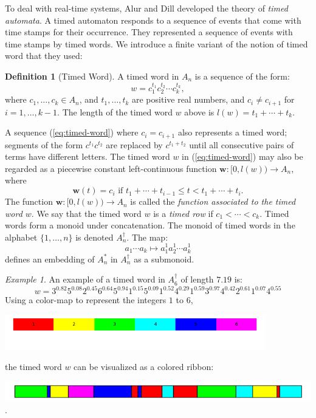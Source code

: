 \documentclass[10pt]{amsproc}
\theoremstyle{definition}
\newtheorem{definition}[theorem]{Definition}
\theoremstyle{remark}
\newtheorem{example}[theorem]{Example}
\begin{document}
To deal with real-time systems, Alur and Dill \cite{alur-dill} developed the theory of \emph{timed automata}.
A timed automaton responds to a sequence of events that come with time stamps for their occurrence.
They represented a sequence of events with time stamps by timed words.
We introduce a finite variant of the notion of timed word that they used:
\begin{definition}
  [Timed Word]
  \label{definition:timed-word}
  A timed word in $A_n$ is a sequence of the form:
  \begin{equation}
    \label{eq:timed-word}
    w=c_1^{t_1} c_2^{t_2}\dotsb c_k^{t_k},
  \end{equation}
  where $c_1,\dotsc,c_k\in A_n$, and $t_1,\dotsc,t_k$ are positive real numbers, and $c_i\neq c_{i+1}$ for $i=1,\dotsc,k-1$.
  The length of the timed word $w$ above is $l(w)=t_1+\dotsb+t_k$.
\end{definition}
A sequence (\ref{eq:timed-word}) where $c_i=c_{i+1}$ also represents a timed word; segments of the form $c^{t_1}c^{t_2}$ are replaced by $c^{t_1+t_2}$ until all consecutive pairs of terms have different letters.
The timed word $w$ in (\ref{eq:timed-word}) may also be regarded as a piecewise constant left-continuous function $\mathbf w:[0,l(w))\to A_n$, where
\begin{displaymath}
  \mathbf w(t) = c_i \text{ if } t_1+\dotsb+t_{i-1}\leq t < t_1+\dotsb + t_i.
\end{displaymath}
The function $\mathbf w:[0, l(w))\to A_n$ is called the \emph{function associated to the timed word $w$}.
We say that the timed word $w$ is a \emph{timed row} if $c_1<\dotsb < c_k$.
Timed words form a monoid under concatenation.
The monoid of timed words in the alphabet $\{1,\dotsc,n\}$ is denoted $A_n^\dagger$.
The map:
\begin{displaymath}
  a_1\dotsb a_k \mapsto a_1^1 a_2^1 \dotsb a_k^1
\end{displaymath}
defines an embedding of $A_n^*$ in $A_n^\dagger$ as a submonoid.
\begin{example}
  \label{example:timed-word}
  An example of a timed word in $A_6^\dagger$ of length $7.19$ is:
  \begin{displaymath}
    w = 3^{0.82}5^{0.08}2^{0.45}6^{0.64}5^{0.94}1^{0.15}5^{0.09}1^{0.52}4^{0.29}1^{0.59}3^{0.97}4^{0.42}2^{0.61}1^{0.07}4^{0.55}
  \end{displaymath}
  Using a color-map to represent the integers $1$ to $6$,
  \begin{center}
    \includegraphics[width=0.85\textwidth]{colormap.png}
  \end{center}
  the timed word $w$ can be visualized as a colored ribbon:
  \begin{center}
    \includegraphics[width=\textwidth]{word.png}.
  \end{center}
\end{example}
\end{document}
